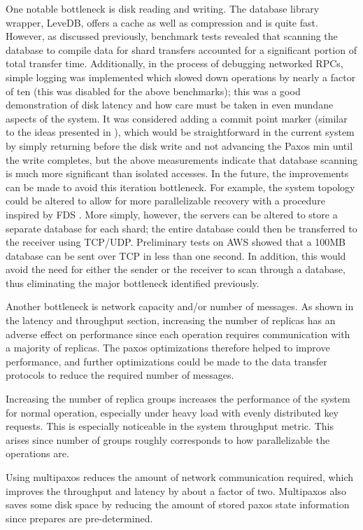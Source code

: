 \documentclass[letterpaper,10pt]{article}
\begin{document}
One notable bottleneck is disk reading and writing.  The database library wrapper, LeveDB, offers a cache as well as compression and is quite fast.  However, as discussed previously, benchmark tests revealed that scanning the database to compile data for shard transfers accounted for a significant portion of total transfer time.  Additionally, in the process of debugging networked RPCs, simple logging was implemented which slowed down operations by nearly a factor of ten (this was disabled for the above benchmarks); this was a good demonstration of disk latency and how care must be taken in even mundane aspects of the system.  It was considered adding a commit point marker (similar to the ideas presented in \cite{harp}), which would be straightforward in the current system by simply returning before the disk write and not advancing the Paxos min until the write completes, but the above measurements indicate that database scanning is much more significant than isolated accesses.  In the future, the improvements can be made to avoid this iteration bottleneck.  For example, the system topology could be altered to allow for more parallelizable recovery with a procedure inspired by FDS \cite{fds}.  More simply, however, the servers can be altered to store a separate database for each shard; the entire database could then be transferred to the receiver using TCP/UDP.  Preliminary tests on AWS showed that a 100MB database can be sent over TCP in less than one second.  In addition, this would avoid the need for either the sender or the receiver to scan through a database, thus eliminating the major bottleneck identified previously.  

Another bottleneck is network capacity and/or number of messages.  As shown in the latency and throughput section, increasing the number of replicas has an adverse effect on performance since each operation requires communication with a majority of replicas.  The paxos optimizations therefore helped to improve performance, and further optimizations could be made to the data transfer protocols to reduce the required number of messages.

Increasing the number of replica groups increases the performance of the system for normal operation, especially under heavy load with evenly distributed key requests. This is especially noticeable in the system throughput metric.  This arises since number of groups roughly corresponds to how parallelizable the operations are.

Using multipaxos reduces the amount of network communication required, which improves the throughput and latency by about a factor of two. Multipaxos also saves some disk space by reducing the amount of stored paxos state information since prepares are pre-determined.  
\end{document}
